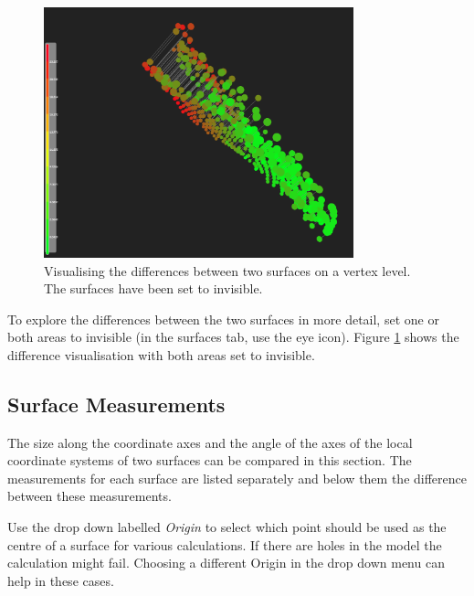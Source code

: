 \begin{figure}[h]
	\centering
	\includegraphics[width=0.8\textwidth]{pics/surfaceComparisonArea3DView2.PNG}
	\caption[Visualising the differences between two surfaces.]{Visualising the differences between two surfaces on a vertex level. The surfaces have been set to invisible.}
	\label{surfaceComparisonArea3DView2.PNG}
\end{figure}

To explore the differences between the two surfaces in more detail, set one or both areas to invisible (in the surfaces tab, use the eye icon). Figure \ref{surfaceComparisonArea3DView2.PNG} shows the difference visualisation with both areas set to invisible.

\clearpage

\subsection{Surface Measurements}


The size along the coordinate axes and the angle of the axes of the local coordinate systems of two surfaces can be compared in this section. The measurements for each surface are listed separately and below them the difference between these measurements.

Use the drop down labelled \emph{Origin} to select which point should be used as the centre of a surface for various calculations. If there are holes in the model the calculation might fail. Choosing a different Origin in the drop down menu can help in these cases.

